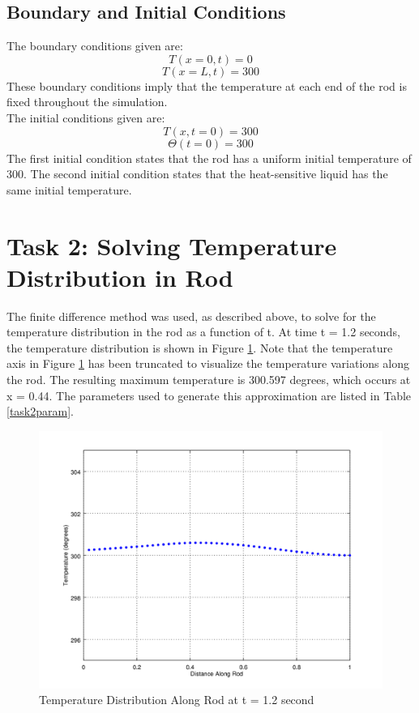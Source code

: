 \documentclass[12pt]{amsart}
\begin{document}
\subsection{Boundary and Initial Conditions}
The boundary conditions given are:
\begin{displaymath}
T(x=0,t) = 0
\end{displaymath}
\begin{displaymath}
T(x=L,t) = 300
\end{displaymath}
These boundary conditions imply that the temperature at each end of the rod is fixed throughout the simulation.\\
The initial conditions given are:
\begin{displaymath}
T(x, t=0) = 300
\end{displaymath}
\begin{displaymath}
\Theta(t=0) = 300
\end{displaymath}
The first initial condition states that the rod has a uniform initial temperature of 300. The second initial condition states that the heat-sensitive liquid has the same initial temperature. 

\section{Task 2: Solving Temperature Distribution in Rod}
The finite difference method was used, as described above, to solve for the temperature distribution in the rod as a function of t. At time t = 1.2 seconds, the temperature distribution is shown in Figure \ref{fig:tempdistat12s}. Note that the temperature axis in Figure \ref{fig:tempdistat12s} has been truncated to visualize the temperature variations along the rod. The resulting maximum temperature is 300.597 degrees, which occurs at x = 0.44. The parameters used to generate this approximation are listed in Table  \ref{task2param}.
\begin{center}
\begin{figure}
\includegraphics[scale=0.7]{task2fig}
\caption{Temperature Distribution Along Rod at t = 1.2 second}
\label{fig:tempdistat12s}
\end{figure}
\end{center}
\end{document}
